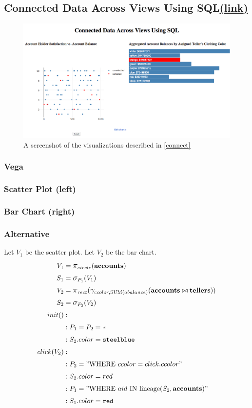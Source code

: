 \documentclass[fleqn]{sigplanconf}
\begin{document}
\subsection{Connected Data Across Views Using SQL\href{http://randy.cs.columbia.edu/lineage/pgbench-connect/pgbench.html}{(\underline{link})}}\label{connect}
\begin{figure}[H]
	\includegraphics[width=\columnwidth]{figures/connect}
	\caption{A screenshot of the visualizations described in \autoref{connect}
	}
	\label{fig_connect}
\end{figure}
\subsubsection{Vega}
\subsubsection*{Scatter Plot (left)}

\subsubsection*{Bar Chart (right)}

\subsubsection{Alternative}
Let $V_1$ be the scatter plot.
Let $V_2$ be the bar chart.
\begin{align*}
	V_1&= \mathlarger{\pi}_{circle}(\bf{accounts})\\
	S_1&= \mathlarger{\sigma}_{P_1}(V_1)\\
	V_2&= \mathlarger{\pi}_{rect}(\mathlarger{\gamma}_{ccolor, \text{SUM}(abalance)}(\bf{accounts}\bowtie{}\bf{tellers}))\\
	S_2&= \mathlarger{\sigma}_{P_2}(V_2)\\
	init()&:\\
	&: P_1 = P_2 = *\\
	&: S_2.color = \texttt{steelblue}\\
	click(V_2)&:\\
	&: P_2 = "\text{WHERE}~ccolor=click.ccolor"\\
	&: S_2.color = red\\
	&: P_1 = "\text{WHERE}~aid~\text{IN~lineage}(S_2, \bf{accounts})"\\
	&: S_1.color = \texttt{red}\\
\end{align*}
\end{document}
